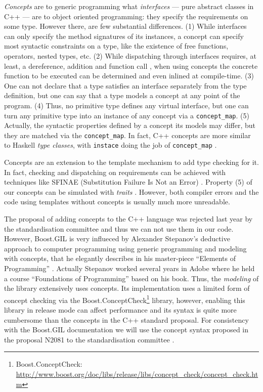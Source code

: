 \emph{Concepts} \cite{jarvi10concept} are to generic programming what
\emph{interfaces} --- pure abstract classes in C++ --- are to object
oriented programming: they specify the requirements on some
type. However there, are few substantial differences. (1) While
interfaces can only specify the method signatures of its instances, a
concept can specify most syntactic constraints on a type, like the
existence of free functions, operators, nested types, etc. (2) While
dispatching through interfaces requires, at least, a dereference,
addition and function call \cite{driesen96direct}, when using concepts
the concrete function to be executed can be determined and even
inlined at compile-time. (3) One can not declare that a type satisfies
an interface separately from the type definition, but one can say that
a type models a concept at any point of the program. (4) Thus, no
primitive type defines any virtual interface, but one can turn any
primitive type into an instance of any concept via a
\texttt{concept\_map}. (5) Actually, the syntactic properties defined
by a concept its models may differ, but they are matched via the
\texttt{concept\_map}. In fact, C++ concepts are more similar to
Haskell \emph{type classes}, with \texttt{instace} doing the job of
\texttt{concept\_map} \cite{bernardy08comparison}.

Concepts are an extension to the template mechanism to add type
checking for it. In fact, checking and dispatching on requirements can
be achieved with techniques like SFINAE (Substitution Failure Is Not
an Error) \cite{vandervoorde08templates}. Property (5) of our concepts
can be simulated with \emph{traits} \cite{c++traits}. However, both
compiler errors and the code using templates without concepts is
usually much more unreadable.

The proposal of adding concepts to the C++ language was rejected last
year by the standardisation committee and thus we can not use them in
our code. However, Boost.GIL is very influeced by Alexander Stepanov's
deductive approach to computer programming using generic programming
and modeling with concepts, that he elegantly describes in his
master-piece ``Elements of Programming''
\cite{stepanov09elements}. Actually Stepanov worked several years in
Adobe where he held a course ``Foundations of Programming'' based on
his book. Thus, the \emph{modeling} of the library extensively uses
concepts. Its implementation uses a limited form of concept checking
via the Boost.ConceptCheck\footnote{
  Boost.ConceptCheck: \url{http://www.boost.org/doc/libs/release/libs/concept_check/concept_check.htm}}
\cite{siek00concept} library, however, enabling this library in
release mode can affect performance and its syntax is quite more
cumbersome than the concepts in the C++ standard proposal. For
consistency with the Boost.GIL documentation we will use the concept
syntax proposed in the proposal N2081 to the standardisation committee
\cite{gregor06concept}.

